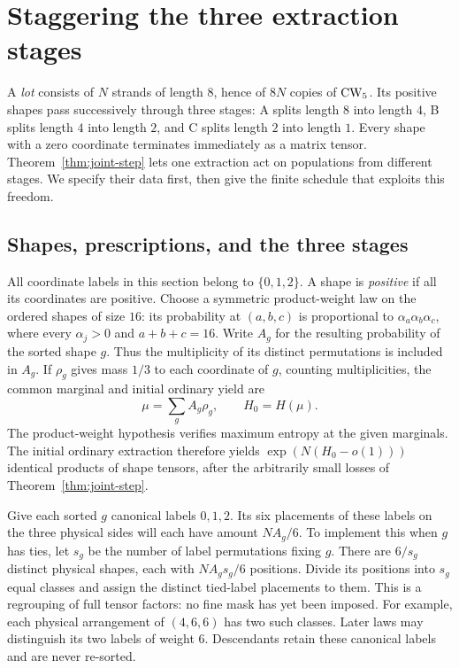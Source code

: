 \section{Staggering the three extraction stages}\label{sec:stagger}

A \emph{lot} consists of $N$ strands of length $8$, hence of $8N$
copies of $\mathrm{CW}_5$.  Its positive shapes pass successively through
three stages: A splits length $8$ into length $4$, B splits length $4$
into length $2$, and C splits length $2$ into length $1$.  Every shape
with a zero coordinate terminates immediately as a matrix tensor.
Theorem~\ref{thm:joint-step} lets one extraction act on populations
from different stages.  We specify their data first, then give the
finite schedule that exploits this freedom.

\subsection{Shapes, prescriptions, and the three stages}

All coordinate labels in this section belong to $\{0,1,2\}$.
A shape is \emph{positive} if all its coordinates are positive.
Choose a symmetric product-weight law on the ordered shapes of size
$16$: its probability at $(a,b,c)$ is proportional to
$\alpha_a\alpha_b\alpha_c$, where every $\alpha_j>0$ and $a+b+c=16$.
Write $A_g$ for the resulting probability of the sorted shape $g$.
Thus the multiplicity of its distinct permutations is included in
$A_g$.  If $\rho_g$ gives mass $1/3$ to each coordinate of $g$, counting
multiplicities, the common marginal and initial ordinary yield are
\begin{equation}\label{eq:initial-yield}
 \mu=\sum_g A_g\rho_g,\qquad H_0=H(\mu).
\end{equation}
The product-weight hypothesis verifies maximum entropy at the given
marginals.  The initial ordinary extraction therefore yields
$\exp(N(H_0-o(1)))$ identical products of shape tensors, after the
arbitrarily small losses of Theorem~\ref{thm:joint-step}.

Give each sorted $g$ canonical labels $0,1,2$.  Its six placements of
these labels on the three physical sides will each have amount
$NA_g/6$.  To implement this when $g$ has ties, let $s_g$ be the number
of label permutations fixing $g$.  There are $6/s_g$ distinct physical
shapes, each with $NA_gs_g/6$ positions.  Divide its positions into
$s_g$ equal classes and assign the distinct tied-label placements to
them.  This is a regrouping of full tensor factors: no fine mask has
yet been imposed.  For example, each physical arrangement of $(4,6,6)$
has two such classes.  Later laws may distinguish its two labels of
weight $6$.  Descendants retain these canonical labels and are never
re-sorted.

